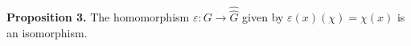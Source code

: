 \textbf{Proposition 3.} The homomorphism $\varepsilon: G \to \hat{\hat{G}}$ given by $\varepsilon(x)(\chi) = \chi(x)$ is an isomorphism.
